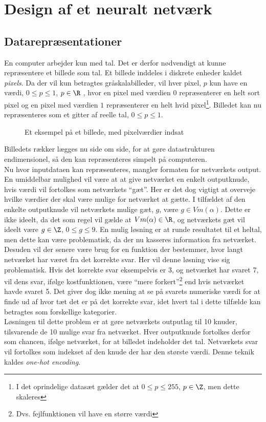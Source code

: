 \documentclass[../SOP.tex]{subfile}
\begin{document}
\section{Design af et neuralt netværk}

\subsection{Datarepræsentationer}
En computer arbejder kun med tal. Det er derfor nødvendigt at kunne repræsentere et billede som tal. Et billede inddeles i diskrete enheder kaldet \emph{pixels}. Da der vil kun betragtes gråskalabilleder, vil hver pixel, $p$ kun have en værdi, $0\leq p \leq 1$, $p\in\R$ , hvor en pixel med værdien $0$ repræsenterer en helt sort pixel og en pixel med værdien $1$ repræsenterer en helt hvid pixel\footnote{I det oprindelige datasæt gælder det at $0\leq p \leq 255$, $p\in\Z$, men dette skaleres}. Billedet kan nu repræsenteres som et gitter af reelle tal, $0\leq p \leq 1$. 
\begin{figure}[ht]
  \centering
  
  \caption{Et eksempel på et billede, med pixelværdier indsat}
  \label{fig:imageformat}
\end{figure}
Billedets rækker lægges nu side om side, for at gøre datastrukturen endimensionel, så den kan repræsenteres simpelt på computeren.\\

Nu hvor inputdataen kan repræsenteres, mangler formaten for netværkets output. En umiddelbar mulighed vil være at at give netværket en enkelt outputknude, hvis værdi vil fortolkes som netværkets ``gæt''. Her er det dog vigtigt at overveje hvilke værdier der skal være mulige for netværket at gætte. I tilfældet af den enkelte outputknude vil netværkets mulige gæt, $g$, være $g \in Vm(\alpha)$. Dette er ikke ideelt, da det som regel vil gælde at $Vm(\alpha)\in\R$, og netværkets gæt vil ideelt være $g\in \Z$, $0\leq g \leq 9$. En mulig løsning er at runde resultatet til et heltal, men dette kan være problematisk, da der nu kasseres information fra netværket. Desuden vil der senere være brug for en funktion der bestemmer, hvor langt netværket har været fra det korrekte svar. Her vil denne løsning vise sig problematisk. Hvis det korrekte svar eksempelvis er 3, og netværket har svaret 7, vil dens svar, ifølge kostfunktionen, være ``mere forkert''\footnote{Dvs. fejlfunktionen vil have en større værdi} end hvis netværket havde svaret 5. Det giver dog ikke mening at se på svarets numeriske værdi for at finde ud af hvor tæt det er på det korrekte svar, idet hvert tal i dette tilfælde kan betragtes som forskellige kategorier.\\
Løsningen til dette problem er at gøre netværkets outputlag til 10 knuder, tilsvarende de 10 mulige svar fra netværket. Hver outputknude fortolkes derfor som chancen, ifølge netværket, for at billedet indeholder det tal. Netværkets svar vil fortolkes som indekset af den knude der har den største værdi. Denne teknik kaldes \emph{one-hot encoding}.
\end{document}
